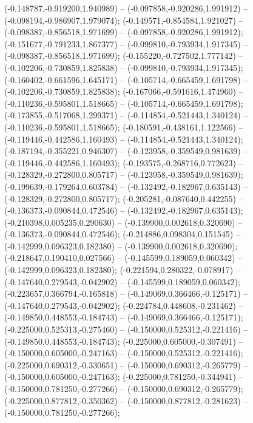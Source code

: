  (-0.148787,-0.919200,1.940989) -- (-0.097858,-0.920286,1.991912) -- (-0.098194,-0.986907,1.979074);
 (-0.149571,-0.854584,1.921027) -- (-0.098387,-0.856518,1.971699) -- (-0.097858,-0.920286,1.991912);
 (-0.151677,-0.791233,1.867377) -- (-0.099810,-0.793934,1.917345) -- (-0.098387,-0.856518,1.971699);
 (-0.155220,-0.727502,1.777142) -- (-0.102206,-0.730859,1.825838) -- (-0.099810,-0.793934,1.917345);
 (-0.160402,-0.661596,1.645171) -- (-0.105714,-0.665459,1.691798) -- (-0.102206,-0.730859,1.825838);
 (-0.167066,-0.591616,1.474960) -- (-0.110236,-0.595801,1.518665) -- (-0.105714,-0.665459,1.691798);
 (-0.173855,-0.517068,1.299371) -- (-0.114854,-0.521443,1.340124) -- (-0.110236,-0.595801,1.518665);
 (-0.180591,-0.438161,1.122566) -- (-0.119446,-0.442586,1.160493) -- (-0.114854,-0.521443,1.340124);
 (-0.187194,-0.355221,0.946307) -- (-0.123958,-0.359549,0.981639) -- (-0.119446,-0.442586,1.160493);
 (-0.193575,-0.268716,0.772623) -- (-0.128329,-0.272800,0.805717) -- (-0.123958,-0.359549,0.981639);
 (-0.199639,-0.179264,0.603784) -- (-0.132492,-0.182967,0.635143) -- (-0.128329,-0.272800,0.805717);
 (-0.205281,-0.087640,0.442255) -- (-0.136373,-0.090844,0.472546) -- (-0.132492,-0.182967,0.635143);
 (-0.210398,0.005235,0.290630) -- (-0.139900,0.002618,0.320690) -- (-0.136373,-0.090844,0.472546);
 (-0.214886,0.098304,0.151545) -- (-0.142999,0.096323,0.182380) -- (-0.139900,0.002618,0.320690);
 (-0.218647,0.190410,0.027566) -- (-0.145599,0.189059,0.060342) -- (-0.142999,0.096323,0.182380);
 (-0.221594,0.280322,-0.078917) -- (-0.147640,0.279543,-0.042902) -- (-0.145599,0.189059,0.060342);
 (-0.223657,0.366794,-0.165818) -- (-0.149069,0.366466,-0.125171) -- (-0.147640,0.279543,-0.042902);
 (-0.224784,0.448608,-0.231462) -- (-0.149850,0.448553,-0.184743) -- (-0.149069,0.366466,-0.125171);
 (-0.225000,0.525313,-0.275460) -- (-0.150000,0.525312,-0.221416) -- (-0.149850,0.448553,-0.184743);
 (-0.225000,0.605000,-0.307491) -- (-0.150000,0.605000,-0.247163) -- (-0.150000,0.525312,-0.221416);
 (-0.225000,0.690312,-0.330651) -- (-0.150000,0.690312,-0.265779) -- (-0.150000,0.605000,-0.247163);
 (-0.225000,0.781250,-0.344941) -- (-0.150000,0.781250,-0.277266) -- (-0.150000,0.690312,-0.265779);
 (-0.225000,0.877812,-0.350362) -- (-0.150000,0.877812,-0.281623) -- (-0.150000,0.781250,-0.277266);
